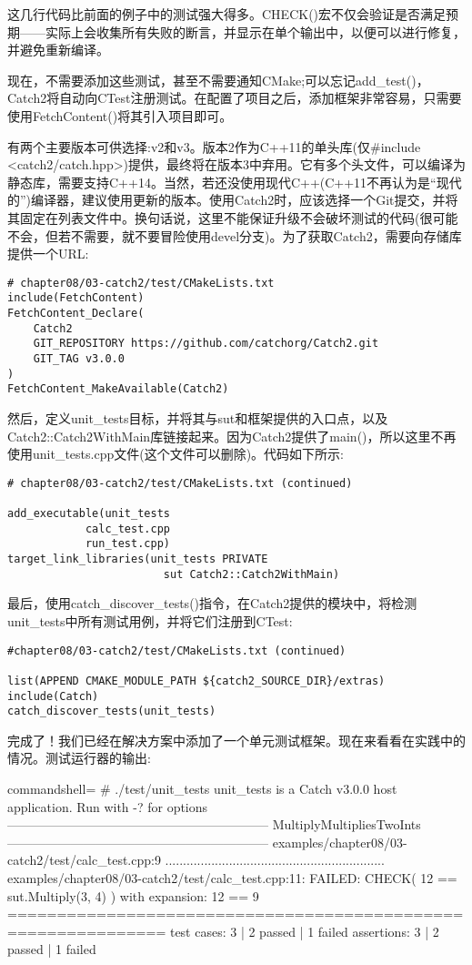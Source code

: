这几行代码比前面的例子中的测试强大得多。CHECK()宏不仅会验证是否满足预期——实际上会收集所有失败的断言，并显示在单个输出中，以便可以进行修复，并避免重新编译。

现在，不需要添加这些测试，甚至不需要通知CMake;可以忘记add\_test()，Catch2将自动向CTest注册测试。在配置了项目之后，添加框架非常容易，只需要使用FetchContent()将其引入项目即可。

有两个主要版本可供选择:v2和v3。版本2作为C++11的单头库(仅\#include <catch2/catch.hpp>)提供，最终将在版本3中弃用。它有多个头文件，可以编译为静态库，需要支持C++14。当然，若还没使用现代C++(C++11不再认为是“现代的”)编译器，建议使用更新的版本。使用Catch2时，应该选择一个Git提交，并将其固定在列表文件中。换句话说，这里不能保证升级不会破坏测试的代码(很可能不会，但若不需要，就不要冒险使用devel分支)。为了获取Catch2，需要向存储库提供一个URL:

\begin{lstlisting}[style=styleCMake]
# chapter08/03-catch2/test/CMakeLists.txt
include(FetchContent)
FetchContent_Declare(
	Catch2
	GIT_REPOSITORY https://github.com/catchorg/Catch2.git
	GIT_TAG v3.0.0
)
FetchContent_MakeAvailable(Catch2)
\end{lstlisting} 

然后，定义unit\_tests目标，并将其与sut和框架提供的入口点，以及Catch2::Catch2WithMain库链接起来。因为Catch2提供了main()，所以这里不再使用unit\_tests.cpp文件(这个文件可以删除)。代码如下所示:

\begin{lstlisting}[style=styleCMake]
# chapter08/03-catch2/test/CMakeLists.txt (continued)

add_executable(unit_tests
			calc_test.cpp
			run_test.cpp)
target_link_libraries(unit_tests PRIVATE
						sut Catch2::Catch2WithMain)
\end{lstlisting} 

最后，使用catch\_discover\_tests()指令，在Catch2提供的模块中，将检测unit\_tests中所有测试用例，并将它们注册到CTest:

\begin{lstlisting}[style=styleCMake]
#chapter08/03-catch2/test/CMakeLists.txt (continued)

list(APPEND CMAKE_MODULE_PATH ${catch2_SOURCE_DIR}/extras)
include(Catch)
catch_discover_tests(unit_tests)
\end{lstlisting} 

完成了！我们已经在解决方案中添加了一个单元测试框架。现在来看看在实践中的情况。测试运行器的输出:

\begin{tcblisting}{commandshell={}}
# ./test/unit_tests
unit_tests is a Catch v3.0.0 host application.
Run with -? for options
--------------------------------------------------------------
MultiplyMultipliesTwoInts
--------------------------------------------------------------
examples/chapter08/03-catch2/test/calc_test.cpp:9
..............................................................
examples/chapter08/03-catch2/test/calc_test.cpp:11: FAILED:
  CHECK( 12 == sut.Multiply(3, 4) )
with expansion:
  12 == 9
==============================================================
test cases: 3 | 2 passed | 1 failed
assertions: 3 | 2 passed | 1 failed
\end{tcblisting}

